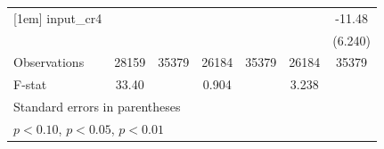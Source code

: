 \begin{table}[htbp]
\begin{tabular}{l*{6}{c}}
[1em]
input\_cr4   &                     &                     &                     &                     &                     &      -11.48\sym{*}  \\
            &                     &                     &                     &                     &                     &     (6.240)         \\
\hline
Observations&       28159         &       35379         &       26184         &       35379         &       26184         &       35379         \\
F-stat      &       33.40         &                     &       0.904         &                     &       3.238         &                     \\
\hline\hline
\multicolumn{7}{l}{\footnotesize Standard errors in parentheses}\\
\multicolumn{7}{l}{\footnotesize \sym{*} \(p<0.10\), \sym{**} \(p<0.05\), \sym{***} \(p<0.01\)}\\
\end{tabular}
\end{table}
